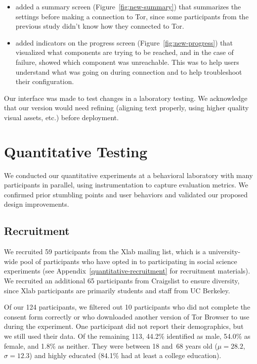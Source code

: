 \documentclass[USenglish,oneside,twocolumn]{article}
\begin{document}
\begin{itemize}
\item{added a summary screen (Figure~\ref{fig:new-summary}) that summarizes the settings before making a connection to Tor, since some participants from the previous study didn't know how they connected to Tor.}
\item{added indicators on the progress screen (Figure~\ref{fig:new-progress}) that visualized what components are trying to be reached, and in the case of failure, showed which component was unreachable. This was to help users understand what was going on during  connection and to help troubleshoot their configuration.}
\end{itemize} 

Our interface was made to test changes in a laboratory testing. We acknowledge that our version would need refining (aligning text properly, using higher quality visual assets, etc.) before deployment. 

\section{Quantitative Testing}
\label{sec:quantitative}
We conducted our quantitative experiments at a behavioral laboratory with many participants in parallel, using instrumentation to capture evaluation metrics. We confirmed prior stumbling points and user behaviors and validated our proposed design improvements.

\subsection{Recruitment}
We recruited 59 participants from the Xlab mailing list, which is a university-wide pool of participants who have opted in to participating in social science experiments (see Appendix~\ref{quantitative-recruitment} for recruitment materials). We recruited an additional 65 participants from Craigslist to ensure diversity, since Xlab participants are primarily students and staff from UC Berkeley.

Of our 124 participants, we filtered out 10 participants who did not complete the consent form correctly or who downloaded another version of Tor Browser to use during the experiment. One participant did not report their demographics, but we still used their data. Of the remaining 113, 44.2\% identified as male, 54.0\% as female, and 1.8\% as neither. They were between 18 and~68 years old ($\mu = 28.2$, $\sigma = 12.3$) and highly educated (84.1\% had at least a college education). 
\end{document}
